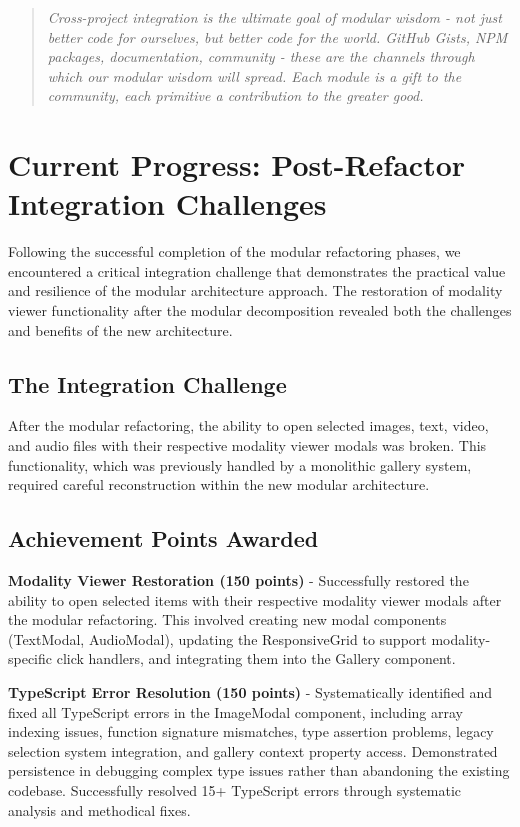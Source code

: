 \documentclass[11pt]{article}
\begin{document}
\begin{quote}
  \emph{Cross-project integration is the ultimate goal of modular wisdom - not just better code for ourselves, but better code for the world. GitHub Gists, NPM packages, documentation, community - these are the channels through which our modular wisdom will spread. Each module is a gift to the community, each primitive a contribution to the greater good.}
\end{quote}
  
\section{Current Progress: Post-Refactor Integration Challenges}

Following the successful completion of the modular refactoring phases, we encountered a critical integration challenge that demonstrates the practical value and resilience of the modular architecture approach. The restoration of modality viewer functionality after the modular decomposition revealed both the challenges and benefits of the new architecture.

\subsection{The Integration Challenge}

After the modular refactoring, the ability to open selected images, text, video, and audio files with their respective modality viewer modals was broken. This functionality, which was previously handled by a monolithic gallery system, required careful reconstruction within the new modular architecture.

\subsection{Achievement Points Awarded}

\textbf{Modality Viewer Restoration (150 points)} - Successfully restored the ability to open selected items with their respective modality viewer modals after the modular refactoring. This involved creating new modal components (TextModal, AudioModal), updating the ResponsiveGrid to support modality-specific click handlers, and integrating them into the Gallery component.

\textbf{TypeScript Error Resolution (150 points)} - Systematically identified and fixed all TypeScript errors in the ImageModal component, including array indexing issues, function signature mismatches, type assertion problems, legacy selection system integration, and gallery context property access. Demonstrated persistence in debugging complex type issues rather than abandoning the existing codebase. Successfully resolved 15+ TypeScript errors through systematic analysis and methodical fixes.
\end{document}
